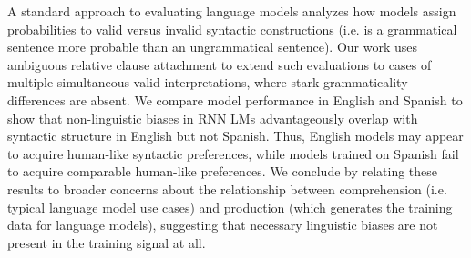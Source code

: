 A standard approach to evaluating language models analyzes how models assign probabilities to valid versus invalid syntactic constructions (i.e. is a grammatical sentence more probable than an ungrammatical sentence). Our work uses ambiguous relative clause attachment to extend such evaluations to cases of multiple simultaneous valid interpretations, where stark grammaticality differences are absent. We compare model performance in English and Spanish to show that non-linguistic biases in RNN LMs advantageously overlap with syntactic structure in English but not Spanish. Thus, English models may appear to acquire human-like syntactic preferences, while models trained on Spanish fail to acquire comparable human-like preferences. We conclude by relating these results to broader concerns about the relationship between comprehension (i.e. typical language model use cases) and production (which generates the training data for language models), suggesting that necessary linguistic biases are not present in the training signal at all.
